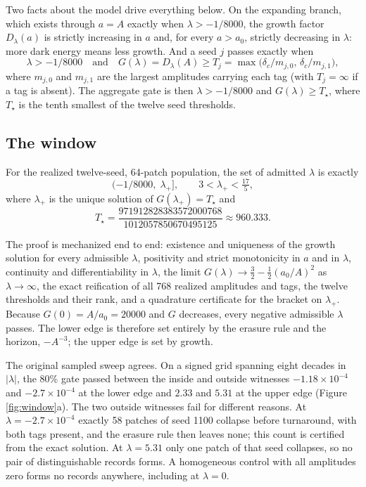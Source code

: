 Two facts about the model drive everything below. On the expanding
branch, which exists through \(a=A\) exactly when \(\lambda>-1/8000\),
the growth factor \(D_\lambda(a)\) is strictly increasing in \(a\) and,
for every \(a>a_0\), strictly decreasing in \(\lambda\): more dark
energy means less growth. And a seed \(j\) passes exactly when
\[\lambda>-1/8000\quad\text{and}\quad G(\lambda)=D_\lambda(A)\ge T_j=\max\bigl(\delta_c/m_{j,0},\,\delta_c/m_{j,1}\bigr),\]
where \(m_{j,0}\) and \(m_{j,1}\) are the largest amplitudes carrying
each tag (with \(T_j=\infty\) if a tag is absent). The aggregate gate is
then \(\lambda>-1/8000\) and \(G(\lambda)\ge T_\star\), where
\(T_\star\) is the tenth smallest of the twelve seed thresholds.

\hypertarget{the-window}{%
\subsection{The window}\label{the-window}}

\begin{theorem}\label{thm:window}
For the realized twelve-seed, 64-patch population, the set of admitted $\lambda$ is exactly
$$(-1/8000,\;\lambda_+],\qquad 3<\lambda_+<\tfrac{17}{5},$$
where $\lambda_+$ is the unique solution of $G(\lambda_+)=T_\star$ and
\[
T_\star=\frac{971912828383572000768}{1012057850670495125}\approx 960.333 .
\]
\end{theorem}

The proof is mechanized end to end: existence and uniqueness of the
growth solution for every admissible \(\lambda\), positivity and strict
monotonicity in \(a\) and in \(\lambda\), continuity and
differentiability in \(\lambda\), the limit
\(G(\lambda)\to\tfrac32-\tfrac12(a_0/A)^2\) as \(\lambda\to\infty\), the
exact reification of all 768 realized amplitudes and tags, the twelve
thresholds and their rank, and a quadrature certificate for the bracket
on \(\lambda_+\). Because \(G(0)=A/a_0=20000\) and \(G\) decreases,
every negative admissible \(\lambda\) passes. The lower edge is
therefore set entirely by the erasure rule and the horizon, \(-A^{-3}\);
the upper edge is set by growth.

The original sampled sweep agrees. On a signed grid spanning eight
decades in \(|\lambda|\), the 80\% gate passed between the inside and
outside witnesses \(-1.18\times10^{-4}\) and \(-2.7\times10^{-4}\) at
the lower edge and \(2.33\) and \(5.31\) at the upper edge (Figure
\ref{fig:window}a). The two outside witnesses fail for different
reasons. At \(\lambda=-2.7\times10^{-4}\) exactly 58 patches of seed
1100 collapse before turnaround, with both tags present, and the erasure
rule then leaves none; this count is certified from the exact solution.
At \(\lambda=5.31\) only one patch of that seed collapses, so no pair of
distinguishable records forms. A homogeneous control with all amplitudes
zero forms no records anywhere, including at \(\lambda=0\).

